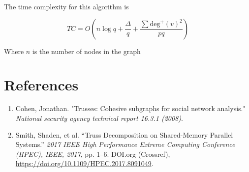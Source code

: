 \documentclass[12pt]{article}
\begin{document}
The time complexity for this algorithm is 

$$TC = O\left(n\log q + \frac{\Delta}{q} + \frac{\sum \text{deg}^+(v)^2}{pq}\right)$$

Where $n$ is the number of nodes in the graph

\section*{References}

\begin{enumerate}
    \item Cohen, Jonathan. "Trusses: Cohesive subgraphs for social network analysis." \textit{National security agency technical report 16.3.1 (2008)}.
    \item Smith, Shaden, et al. “Truss Decomposition on Shared-Memory Parallel Systems.” \textit{2017 IEEE High Performance Extreme Computing Conference (HPEC), IEEE, 2017}, pp. 1–6. DOI.org (Crossref), \href{https://doi.org/10.1109/HPEC.2017.8091049}{https://doi.org/10.1109/HPEC.2017.8091049}.
\end{enumerate}
\end{document}
